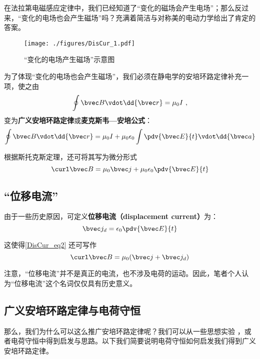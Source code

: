 
\begin{issues}
\issueDraft
\end{issues}


在法拉第电磁感应定律中，我们已经知道了“变化的磁场会产生电场”；那么反过来，“变化的电场也会产生磁场”吗？充满着简洁与对称美的电动力学给出了肯定的答案。

\begin{figure}[ht]
\centering
\texttt{[image: ./figures/DisCur\_1.pdf]}
\caption{“变化的电场产生磁场”示意图} \label{DisCur_fig1}
\end{figure}

为了体现“变化的电场也会产生磁场”，我们必须在静电学的安培环路定律补充一项，使之由
\begin{equation}
\oint \bvec B \vdot \dd{\bvec r} = \mu_0 I~,
\end{equation}
变为\textbf{广义安培环路定律}或\textbf{麦克斯韦—安培公式}：
\begin{equation}
\oint \bvec B \vdot \dd{\bvec r} = \mu_0 I + \mu_0 \epsilon_0 \int \pdv{\bvec E}{t} \vdot \dd{\bvec a}
\end{equation}

根据斯托克斯定理，还可将其写为微分形式
\begin{equation}\label{DisCur_eq2}
\curl \bvec B = \mu_0 \bvec j + \mu_0\epsilon_0 \pdv{\bvec E}{t}
\end{equation}

\subsection{“位移电流”}
由于一些历史原因，可定义\textbf{位移电流（displacement current）}为：
\begin{equation}
\bvec j_d = \epsilon_0 \pdv{\bvec E}{t}
\end{equation}

这使得\autoref{DisCur_eq2} 还可写作
\begin{equation}
\curl \bvec B = \mu_0 (\bvec j + \bvec j_d)
\end{equation}

注意，“位移电流”并不是真正的电流，也不涉及电荷的运动。因此，笔者个人认为“位移电流”这个名词仅仅具有历史意义。

\subsection{广义安培环路定律与电荷守恒}
那么，我们为什么可以这么推广安培环路定律呢？我们可以从一些思想实验
，或者电荷守恒中得到启发与思路。以下我们简要说明电荷守恒如何启发我们得到广义安培环路定律。

